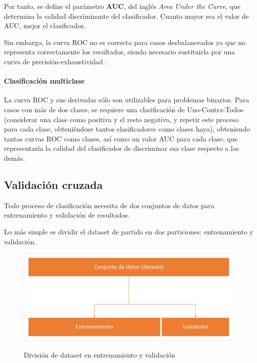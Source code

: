 Por tanto, se define el parámetro \textbf{AUC}, del inglés \textit{Area Under the Curve}, que determina la calidad discriminante del clasificador. Cuanto mayor sea el valor de AUC, mejor el clasificador.

Sin embargo, la curva ROC no es correcta para casos desbalanceados ya que no representa correctamente los resultados, siendo necesario sustituirla por una curva de precisión-exhaustividad \cite{10.1371/journal.pone.0118432}. 

\paragraph{Clasificación multiclase} La curva ROC y sus derivadas sólo son utilizables para problemas binarios. Para casos con más de dos clases, se requiere una clasificación de Uno-Contra-Todos (considerar una clase como positiva y el resto negativa, y repetir este proceso para cada clase, obteniéndose tantos clasificadores como clases haya), obteniendo tantas curvas ROC como clases, así como un valor AUC para cada clase, que representaría la calidad del clasificador de discriminar esa clase respecto a las demás.

\subsection{Validación cruzada}

Todo proceso de clasificación necesita de dos conjuntos de datos para entrenamiento y validación de resultados.

Lo más simple es dividir el dataset de partida en dos particiones: entrenamiento y validación.

\begin{figure}[h]
	\centering
	\captionsetup{justification=centering}
	\includegraphics[width=\textwidth]{imagenes/marco_teorico/CV/train_test_split.pdf}
	\label{fig:CV_train_test_split}
	\caption{División de dataset en entrenamiento y validación}
\end{figure}

